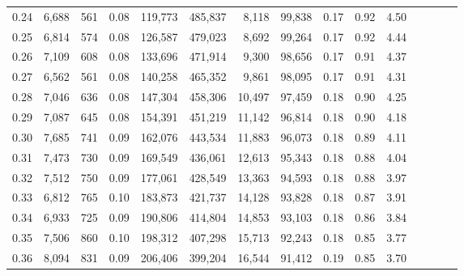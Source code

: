 \begin{tabular}{rrrcrrrrrrrrrrr}
0.24 &   6,688 &    561 &                                       0.08 &  119,773 &  485,837 &    8,118 &   99,838 &  0.17 &  0.92 &                         4.50 \\
0.25 &   6,814 &    574 &                                       0.08 &  126,587 &  479,023 &    8,692 &   99,264 &  0.17 &  0.92 &                         4.44 \\
0.26 &   7,109 &    608 &                                       0.08 &  133,696 &  471,914 &    9,300 &   98,656 &  0.17 &  0.91 &                         4.37 \\
0.27 &   6,562 &    561 &                                       0.08 &  140,258 &  465,352 &    9,861 &   98,095 &  0.17 &  0.91 &                         4.31 \\
0.28 &   7,046 &    636 &                                       0.08 &  147,304 &  458,306 &   10,497 &   97,459 &  0.18 &  0.90 &                         4.25 \\
0.29 &   7,087 &    645 &                                       0.08 &  154,391 &  451,219 &   11,142 &   96,814 &  0.18 &  0.90 &                         4.18 \\
0.30 &   7,685 &    741 &                                       0.09 &  162,076 &  443,534 &   11,883 &   96,073 &  0.18 &  0.89 &                         4.11 \\
0.31 &   7,473 &    730 &                                       0.09 &  169,549 &  436,061 &   12,613 &   95,343 &  0.18 &  0.88 &                         4.04 \\
0.32 &   7,512 &    750 &                                       0.09 &  177,061 &  428,549 &   13,363 &   94,593 &  0.18 &  0.88 &                         3.97 \\
0.33 &   6,812 &    765 &                                       0.10 &  183,873 &  421,737 &   14,128 &   93,828 &  0.18 &  0.87 &                         3.91 \\
0.34 &   6,933 &    725 &                                       0.09 &  190,806 &  414,804 &   14,853 &   93,103 &  0.18 &  0.86 &                         3.84 \\
0.35 &   7,506 &    860 &                                       0.10 &  198,312 &  407,298 &   15,713 &   92,243 &  0.18 &  0.85 &                         3.77 \\
0.36 &   8,094 &    831 &                                       0.09 &  206,406 &  399,204 &   16,544 &   91,412 &  0.19 &  0.85 &                         3.70 \\

\end{tabular}
